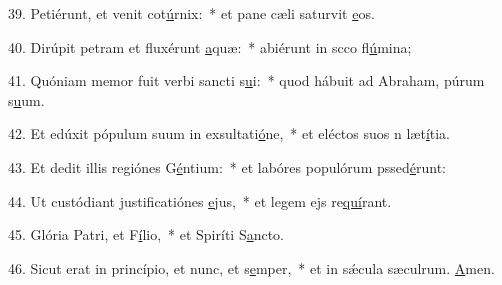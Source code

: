 39. Petiérunt, et venit cot\uline{ú}rnix:~* et pane cæli saturvit \uline{e}os.\par 
40. Dirúpit petram et fluxérunt \uline{a}quæ:~* abiérunt in scco fl\uline{ú}mina;\par 
41. Quóniam memor fuit verbi sancti s\uline{u}i:~* quod hábuit ad Abraham, púrum s\uline{u}um.\par 
42. Et edúxit pópulum suum in exsultati\uline{ó}ne,~* et eléctos suos n læt\uline{í}tia.\par 
43. Et dedit illis regiónes G\uline{é}ntium:~* et labóres populórum pssed\uline{é}runt:\par 
44. Ut custódiant justificatiónes \uline{e}jus,~* et legem ejs re\uline{quí}rant.\par 
45. Glória Patri, et F\uline{í}lio,~* et Spiríti S\uline{a}ncto.\par 
46. Sicut erat in princípio, et nunc, et s\uline{e}mper,~* et in sǽcula sæculrum. \uline{A}men.\par 
